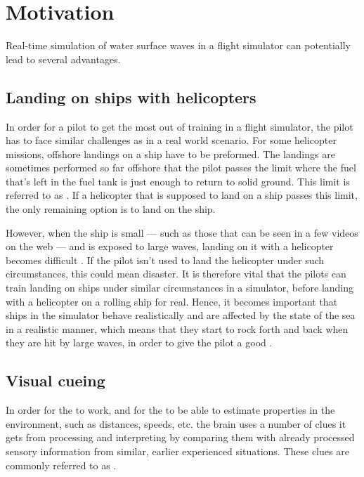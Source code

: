 \chapter{Motivation}
\label{chap:motivation}

Real-time simulation of water surface waves in a flight simulator can potentially lead to several advantages.

\section{Landing on ships with helicopters}

In order for a pilot to get the most out of training in a flight simulator, the pilot has to face similar challenges as in a real world scenario. For some helicopter missions, offshore landings on a ship have to be preformed. The landings are sometimes performed so far offshore that the pilot passes the limit where the fuel that's left in the fuel tank is just enough to return to solid ground. This limit is referred to as . If a helicopter that is supposed to land on a ship passes this limit, the only remaining option is to land on the ship.

However, when the ship is small --- such as those that can be seen in a few videos on the web \citep{MrOawal2009,PrismDefence2010,KopulaDK2010} --- and is exposed to large waves, landing on it with a helicopter becomes difficult \citep{PrismDefence2010}. If the pilot isn't used to land the helicopter under such circumstances, this could mean disaster. It is therefore vital that the pilots can train landing on ships under similar circumstances in a simulator, before landing with a helicopter on a rolling ship for real. Hence, it becomes important that ships in the simulator behave realistically and are affected by the state of the sea in a realistic manner, which means that they start to rock forth and back when they are hit by large waves, in order to give the pilot a good .

\section{Visual cueing}

In order for the  to work, and for the \brain to be able to estimate properties in the environment, such as distances, speeds, etc. the brain uses a number of clues it gets from processing and interpreting  by comparing them with already processed sensory information from similar, earlier experienced situations. These clues are commonly referred to as .

